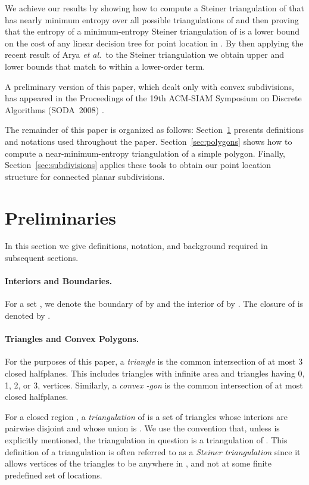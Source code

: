 \documentclass[lotsofwhite]{patmorin}
\newcommand{\seclabel}[1]{\label{sec:#1}}
\newcommand{\Secref}[1]{Section~\ref{sec:#1}}
\newcommand{\secref}[1]{\mbox{Section~\ref{sec:#1}}}
\newcommand{\etal}{\emph{et al.}}
\begin{document}
We achieve our results by showing how to compute a Steiner
triangulation  of  that has nearly minimum
entropy over all possible triangulations of  and then proving that
the entropy of a minimum-entropy Steiner triangulation of  is a
lower bound on the cost of any linear decision tree for point location
in .  By then applying the recent result of Arya \etal\ to the
Steiner triangulation  we obtain upper and lower bounds that
match to within a lower-order term.


A preliminary version of this paper, which dealt only with convex
subdivisions, has appeared in the Proceedings of the 19th ACM-SIAM
Symposium on Discrete Algorithms (SODA~2008) \cite{cdilm08}.

The remainder of this paper is organized as follows:  \Secref{prelim}
presents definitions and notations used throughout the paper.
\Secref{polygons} shows how to compute a near-minimum-entropy
triangulation of a simple polygon.  Finally, \secref{subdivisions}
applies these tools to obtain our point location structure for
connected planar subdivisions.


\section{Preliminaries}
\seclabel{prelim}

In this section we give definitions, notation, and background
required in subsequent sections.

\paragraph{Interiors and Boundaries.}
For a set , we denote the boundary of  by 
and the interior of  by .  The closure of 
is denoted by .


\paragraph{Triangles and Convex Polygons.}  For the purposes of this
paper, a \emph{triangle} is the common intersection of at most 3
closed halfplanes.  This includes triangles with infinite area and
triangles having 0, 1, 2, or 3, vertices. Similarly, a \emph{convex
-gon} is the common intersection of at most  closed halfplanes.

For a closed region , a \emph{triangulation} of 
is a set of triangles whose interiors are pairwise disjoint and whose
union is .  We use the convention that, unless  is explicitly
mentioned, the triangulation in question is a triangulation of .
This definition of a triangulation is often referred to as a
\emph{Steiner triangulation} since it allows vertices of the triangles
to be anywhere in , and not at some finite predefined set of
locations.
\end{document}
